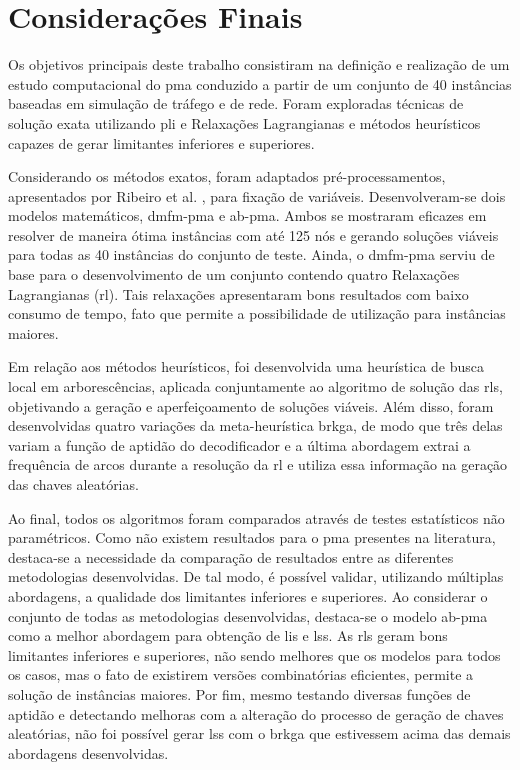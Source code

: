 
\chapter{Considerações Finais} \label{chp:consideracoes-finais}

Os objetivos principais deste trabalho  consistiram na definição e realização de
um estudo  computacional do \gls{pma}  conduzido a partir  de um conjunto  de 40
instâncias baseadas em simulação de tráfego e de rede. Foram exploradas técnicas
de  solução  exata utilizando  \gls{pli}  e  Relaxações Lagrangianas  e  métodos
heurísticos capazes de gerar limitantes inferiores e superiores.

Considerando os métodos exatos, foram adaptados pré-processamentos, apresentados
por   Ribeiro   et   al.   \cite{tiago:2019},   para   fixação   de   variáveis.
Desenvolveram-se dois modelos matemáticos,  \gls{dmfm-pma} e \gls{ab-pma}. Ambos
se mostraram eficazes em resolver de maneira  ótima instâncias com até 125 nós e
gerando  soluções viáveis  para todas  as 40  instâncias do  conjunto de  teste.
Ainda, o  \gls{dmfm-pma} serviu de  base para  o desenvolvimento de  um conjunto
contendo quatro Relaxações Lagrangianas (\gls{rl}). Tais relaxações apresentaram
bons resultados com baixo consumo de  tempo, fato que permite a possibilidade de
utilização para instâncias maiores.

Em relação  aos métodos  heurísticos, foi desenvolvida  uma heurística  de busca
local  em arborescências,  aplicada conjuntamente  ao algoritmo  de solução  das
\gls{rl}s, objetivando  a geração  e aperfeiçoamento  de soluções  viáveis. Além
disso, foram  desenvolvidas quatro variações da  meta-heurística \gls{brkga}, de
modo que  três delas  variam a  função de  aptidão do  decodificador e  a última
abordagem extrai a frequência de arcos durante a resolução da \gls{rl} e utiliza
essa informação na geração das chaves aleatórias.

Ao final,  todos os algoritmos  foram comparados através de  testes estatísticos
não  paramétricos. Como  não existem  resultados para  o \gls{pma}  presentes na
literatura,  destaca-se  a necessidade  da  comparação  de resultados  entre  as
diferentes  metodologias  desenvolvidas.  De   tal  modo,  é  possível  validar,
utilizando  múltiplas  abordagens,  a  qualidade  dos  limitantes  inferiores  e
superiores. Ao  considerar o  conjunto de  todas as  metodologias desenvolvidas,
destaca-se  o modelo  \gls{ab-pma}  como  a melhor  abordagem  para obtenção  de
\gls{li}s  e  \gls{ls}s.  As  \gls{rl}s   geram  bons  limitantes  inferiores  e
superiores, não sendo melhores que os modelos para todos os casos, mas o fato de
existirem  versões combinatórias  eficientes,  permite a  solução de  instâncias
maiores.  Por fim,  mesmo  testando  diversas funções  de  aptidão e  detectando
melhoras com  a alteração do processo  de geração de chaves  aleatórias, não foi
possível  gerar \gls{ls}s  com o  \gls{brkga}  que estivessem  acima das  demais
abordagens desenvolvidas.

